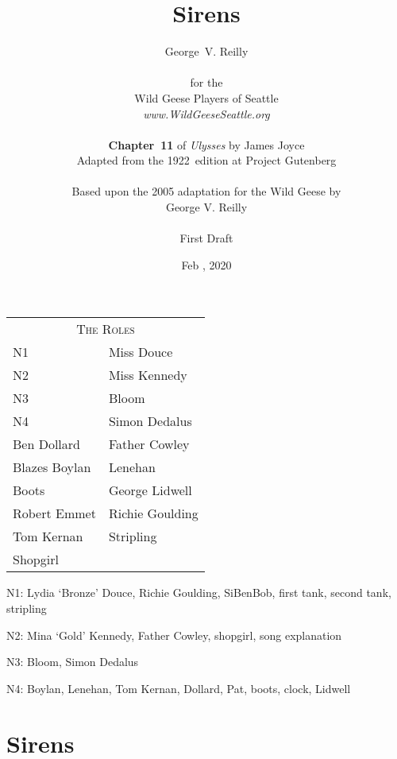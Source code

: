 


\title{\Huge Sirens}
\author{George~V. Reilly\\
\\
{\small for the}\\
Wild Geese Players of Seattle\\
{\textit{www.WildGeeseSeattle.org}}\\
\\
{\small \textbf{Chapter~11} of \textit{Ulysses} by James Joyce}\\
{\small Adapted from the 1922~edition at Project Gutenberg}
\\
\\
{\small Based upon the 2005 adaptation for the Wild Geese by}\\
{\small George V. Reilly}\\
\\
{\small First Draft}}
\date{Feb , 2020}
\raggedbottom



\maketitle
\thispagestyle{empty}
\pagebreak

\begin{tabular}{lp{10cm}}
    \multicolumn{2}{c}{\Large \textsc{The Roles}} \\
N1              & Miss Douce \\
N2              & Miss Kennedy \\
N3              & Bloom \\
N4              & Simon Dedalus \\
Ben Dollard     & Father Cowley \\
Blazes Boylan   & Lenehan \\
Boots           & George Lidwell \\
Robert Emmet    & Richie Goulding \\
Tom Kernan      & Stripling \\
Shopgirl \\
\end{tabular}

\bigskip

N1: Lydia `Bronze' Douce,
Richie Goulding,
SiBenBob,
first tank,
second tank,
stripling

N2: Mina `Gold' Kennedy,
Father Cowley,
shopgirl,
song explanation

N3: Bloom,
Simon Dedalus

N4: Boylan,
Lenehan,
Tom Kernan,
Dollard,
Pat,
boots,
clock,
Lidwell

\thispagestyle{empty}
\newpage


\setcounter{page}{1}

\section*{Sirens}




